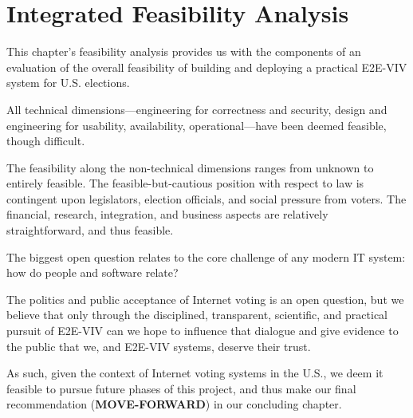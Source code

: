 \section{Integrated Feasibility Analysis}

This chapter's feasibility analysis provides us with the components of
an evaluation of the overall feasibility of building and deploying a
practical E2E-VIV system for U.S. elections.

All technical dimensions---engineering for correctness and security,
design and engineering for usability, availability, operational---have
been deemed feasible, though difficult.

The feasibility along the non-technical dimensions ranges from unknown
to entirely feasible.  The feasible-but-cautious position with respect
to law is contingent upon legislators, election officials, and social
pressure from voters.  The financial, research, integration, and
business aspects are relatively straightforward, and thus feasible.

The biggest open question relates to the core challenge of any modern
IT system: how do people and software relate?

The politics and public acceptance of Internet voting is an open
question, but we believe that only through the disciplined,
transparent, scientific, and practical pursuit of E2E-VIV can we hope
to influence that dialogue and give evidence to the public that we,
and E2E-VIV systems, deserve their trust.

As such, given the context of Internet voting systems in the U.S., we
deem it feasible to pursue future phases of this project, and thus
make our final recommendation (\textbf{MOVE-FORWARD}) in our
concluding chapter.


